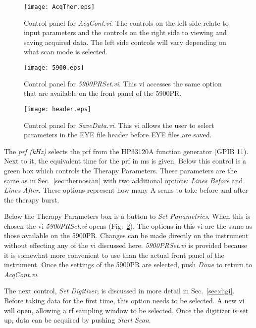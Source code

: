 \documentclass[10pt]{article}
\begin{document}
\begin{figure}[!htb]
\begin{center}
\texttt{[image: AcqTher.eps]}
 \caption{Control panel for {\it AcqCont.vi}. The controls on the left side
 relate to input parameters and the controls on the right side to viewing
 and saving acquired data. The left side controls will vary depending on what scan
 mode is selected.}
 \label{fig:AcqTher}
\end{center}
\end{figure}
\begin{figure}[!htb]
\begin{center}
\texttt{[image: 5900.eps]}
 \caption{Control panel for {\it 5900PRSet.vi}. This vi accesses the same
 option that are available on the front panel of the 5900PR.}
 \label{fig:5900}
\end{center}
\end{figure}
\begin{figure}[!htb]
\begin{center}
\texttt{[image: header.eps]}
 \caption{Control panel for {\it SaveData.vi}. This vi allows the
 user to select parameters in the EYE file header before EYE files
 are saved.}
 \label{fig:header}
\end{center}
\end{figure}

The {\it prf (kHz)} selects the prf from the HP33120A function
generator (GPIB 11). Next to it, the equivalent time for the prf
in ms is given. Below this control is a green box which controls
the Therapy Parameters. These parameters are the same as in
Sec.~\ref{sec:thernoscan} with two additional options: {\it Lines
Before} and {\it Lines After}. These options represent how many A
scans to take before and after the therapy burst.

Below the Therapy Parameters box is a button to {\it Set
Panametrics}. When this is chosen the vi {\it 5900PRSet.vi} opens
(Fig.~\ref{fig:5900}). The options in this vi are the same as
those available on the 5900PR. Changes can be made directly on the
instrument without effecting any of the vi discussed here. {\it
5900PRSet.vi} is provided because it is somewhat more convenient
to use than the actual front panel of the instrument. Once the
settings of the 5900PR are selected, push {\it Done} to return to
{\it AcqCont.vi}.

The next control, {\it Set Digitizer}, is discussed in more detail
in Sec.~\ref{sec:digi}. Before taking data for the first time,
this option needs to be selected. A new vi will open, allowing a
rf sampling window to be selected. Once the digitizer is set up,
data can be acquired by pushing {\it Start Scan}.
\end{document}
